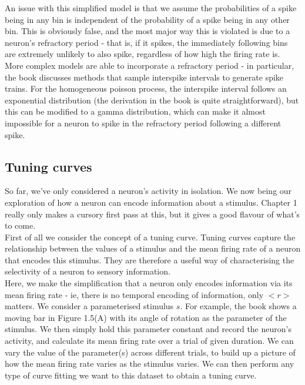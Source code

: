 \documentclass{article}
\begin{document}
An issue with this simplified model is that we assume the probabilities of a spike being in any bin is independent of the probability of a spike being in any other bin. This is obviously false, and the most major way this is violated is due to a neuron's refractory period - that is, if it spikes, the immediately following bins are extremely unlikely to also spike, regardless of how high the firing rate is. More complex models are able to incorporate a refractory period - in particular, the book discusses methods that sample interspike intervals to generate spike trains. For the homogeneous poisson process, the interspike interval follows an exponential distribution (the derivation in the book is quite straightforward), but this can be modified to a gamma distribution, which can make it almost impossible for a neuron to spike in the refractory period following a different spike.

\subsection{Tuning curves}

So far, we've only considered a neuron's activity in isolation. We now being our exploration of how a neuron can encode information about a stimulus. Chapter 1 really only makes a cursory first pass at this, but it gives a good flavour of what's to come.\\

First of all we consider the concept of a tuning curve. Tuning curves capture the relationship between the values of a stimulus and the mean firing rate of a neuron that encodes this stimulus. They are therefore a useful way of characterising the selectivity of a neuron to sensory information.\\

Here, we make the simplification that a neuron only encodes information via its mean firing rate - ie, there is no temporal encoding of information, only $<r>$ matters. We consider a parameterised stimulus $s$. For example, the book shows a moving bar in Figure 1.5(A) with its angle of rotation as the parameter of the stimulus. We then simply hold this parameter constant and record the neuron's activity, and calculate its mean firing rate over a trial of given duration. We can vary the value of the parameter(s) across different trials, to build up a picture of how the mean firing rate varies as the stimulus varies. We can then perform any type of curve fitting we want to this dataset to obtain a tuning curve.\\
\end{document}
